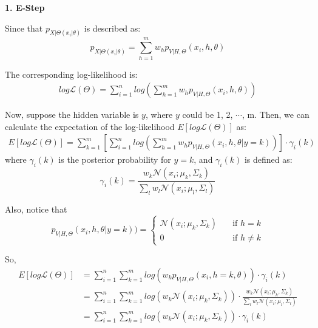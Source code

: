 \begin{description}
\item{\bf \large 1. E-Step}

Since that $p_{X|\Theta(x_i|\theta)}$ is described as:
\begin{equation}
	p_{X|\Theta(x_i|\theta)} = \sum_{h=1}^{m} w_h p_{V|H, \Theta}(x_i, h, \theta)
\end{equation}

The corresponding log-likelihood is:
\begin{equation}
\begin{split}
log\mathcal{L}(\Theta) = \sum_{i=1}^n log(\sum_{h=1}^m w_h p_{V|H, \Theta}(x_i, h, \theta))
\end{split} 
\end{equation}

Now, suppose the hidden variable is $y$, where $y$ could be 1, 2, $\cdots$, m. Then, we can calculate the expectation of the log-likelihood $E[log\mathcal{L}(\Theta)]$ as:
\begin{equation}
\begin{split}
E[log\mathcal{L}(\Theta)] = \sum_{k=1}^m [\sum_{i=1}^n log(\sum_{h=1}^m w_h p_{V|H, \Theta}(x_i, h, \theta | y=k))] \cdot \gamma_i(k)
\end{split} 
\end{equation}
where $\gamma_i(k)$ is the posterior probability for $y = k$, and $\gamma_i(k)$ is defined as:
\begin{equation}
	\gamma_i(k) = \frac{w_k \mathcal{N}(x_i; \mu_k, \Sigma_k)}{\sum_l w_l \mathcal{N}(x_i; \mu_l, \Sigma_l)}
\end{equation}

Also, notice that 
\begin{equation}
p_{V|H, \Theta}(x_i, h, \theta | y=k)) = 
	\begin{cases}
		\mathcal{N}(x_i; \mu_k, \Sigma_k)  & \quad \text{if } h = k \\
		0 & \quad \text{if } h \neq k
	\end{cases}
\end{equation}

So, 
\begin{equation}
\begin{split}
E[log\mathcal{L}(\Theta)] & = \sum_{i=1}^n \sum_{k=1}^m log(w_k p_{V|H, \Theta}(x_i, h=k, \theta)) \cdot \gamma_i(k) \\
						  & =  \sum_{i=1}^n \sum_{k=1}^m log(w_k \mathcal{N}(x_i; \mu_k, \Sigma_k))\cdot \frac{w_k \mathcal{N}(x_i; \mu_k, \Sigma_k)}{\sum_l w_l \mathcal{N}(x_i; \mu_l, \Sigma_l)} \\
						  & = \sum_{i=1}^n \sum_{k=1}^m log(w_k \mathcal{N}(x_i; \mu_k, \Sigma_k))\cdot \gamma_i(k)
\end{split} 
\end{equation}


\end{description}

